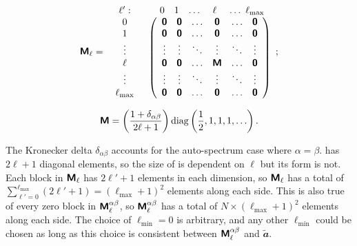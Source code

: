 \begin{equation}
\bm{\mathsf{M}}_\ell =
\begin{array}{c l} \ell': &
\begin{array}{c c c c c c c}
\hphantom{~~}0 & 1 & \ldots & \hphantom{~}\ell & \hphantom{\,}\ldots & \hspace{-0.5em}\ell_\mathrm{max}
\end{array} \\
\begin{array}{c}
0 \\ 1 \\ \vdots \\ \ell \\ \vdots \\ \ell_\mathrm{max}
\end{array} &
\left(
\begin{array}{c c c c c c c}
\bm{\mathsf{0}} & \bm{\mathsf{0}} & \ldots & \bm{\mathsf{0}} & \ldots & \bm{\mathsf{0}} \\
\bm{\mathsf{0}} & \bm{\mathsf{0}} & \ldots & \bm{\mathsf{0}} & \ldots & \bm{\mathsf{0}} \\
\vdots & \vdots & \ddots & \vdots & \ddots & \vdots \\
\bm{\mathsf{0}} & \bm{\mathsf{0}} & \ldots & \bm{\mathsf{M}} & \ldots & \bm{\mathsf{0}} \\
\vdots & \vdots & \ddots & \vdots & \ddots & \vdots \\
\bm{\mathsf{0}} & \bm{\mathsf{0}} & \ldots & \bm{\mathsf{0}} & \ldots & \bm{\mathsf{0}} \\
\end{array}
\right)
\end{array};
\end{equation}

\begin{equation}
\bm{\mathsf{M}} =
\left( \frac{1 + \delta_{\alpha \beta}}{2 \ell + 1}  \right)
\mathrm{diag} \left( \frac{1}{2}, 1, 1, 1, \ldots \right).
\label{el_Eqn:m_diag}
\end{equation}

The Kronecker delta $\delta_{\alpha \beta}$ accounts for the auto-spectrum case where $\alpha = \beta$.  has $2 \ell + 1$ diagonal elements, so the size of  is dependent on $\ell$ but its form is not. Each block in $\bm{\mathsf{M}}_\ell$ has $2 \ell' + 1$ elements in each dimension, so $\bm{\mathsf{M}}_\ell$ has a total of $\sum_{\ell' = 0}^{\ell_\mathrm{max}} \left( 2 \ell' + 1 \right) = \left( \ell_\mathrm{max} + 1 \right)^2$ elements along each side. This is also true of every zero block in $\bm{\mathsf{M}}_\ell^{\alpha \beta}$, so $\bm{\mathsf{M}}_\ell^{\alpha \beta}$ has a total of $N \times \left( \ell_\mathrm{max} + 1 \right)^2$ elements along each side. The choice of $\ell_\mathrm{\min} = 0$ is arbitrary, and any other $\ell_\mathrm{\min}$ could be chosen as long as this choice is consistent between $\bm{\mathsf{M}}_\ell^{\alpha \beta}$ and $\widetilde{\mathbfit{a}}$.

